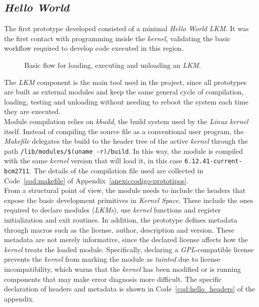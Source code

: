 \subsection{\textit{Hello World}}

The first prototype developed consisted of a minimal \textit{Hello World} \textit{LKM}.
It was the first contact with programming inside the \textit{kernel}, validating the basic workflow required to develop code executed in this region.\\

\begin{figure}[h!]
  \centering
  \scalebox{1}{}
  \caption{Basic flow for loading, executing and unloading an \textit{LKM}.}
  \label{fig:hello_world_scheme}
\end{figure}

The \textit{LKM} component is the main tool used in the project, since all prototypes are built as external modules and keep the same general cycle of compilation, loading, testing and unloading without needing to reboot the system each time they are executed.\\

Module compilation relies on \textit{kbuild}, the build system used by the \textit{Linux kernel} itself.
Instead of compiling the source file as a conventional user program, the \textit{Makefile} delegates the build to the header tree of the active \textit{kernel} through the path \texttt{/lib/modules/\$(uname -r)/build}.
In this way, the module is compiled with the same \textit{kernel} version that will load it, in this case \texttt{6.12.41-current-bcm2711}.
The details of the compilation file used are collected in Code~\ref{cod:makefile} of Appendix~\ref{anexo:codigo-prototipos}.\\

From a structural point of view, the module needs to include the headers that expose the basic development primitives in \textit{Kernel Space}.
These include the ones required to declare modules (\textit{LKMs}), use \textit{kernel} functions and register initialization and exit routines.
In addition, the prototype defines metadata through macros such as the license, author, description and version.
These metadata are not merely informative, since the declared license affects how the \textit{kernel} treats the loaded module.
Specifically, declaring a \textit{GPL}-compatible license prevents the \textit{kernel} from marking the module as \textit{tainted} due to license incompatibility, which warns that the \textit{kernel} has been modified or is running components that may make error diagnosis more difficult.
The specific declaration of headers and metadata is shown in Code~\ref{cod:hello_headers} of the appendix.\\

